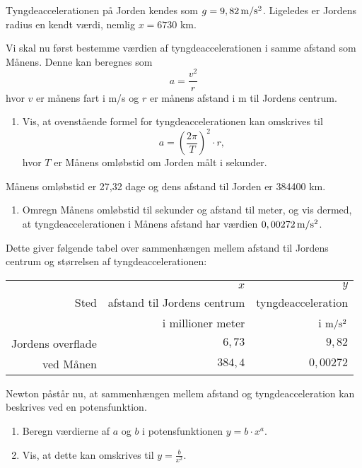 \documentclass[12pt,oneside,a4paper]{article}
\newcommand{\be}{\begin{equation}}
\newcommand{\ee}{\end{equation}}
\theoremstyle{plain}
\begin{document}
Tyngdeaccelerationen på Jorden kendes som $g=9,82\, {\rm m}/{\rm s}^2$.
Ligeledes er Jordens radius en kendt værdi, nemlig $x=6730$ km.

Vi skal nu først bestemme værdien af tyngdeaccelerationen i samme afstand som Månens.
Denne kan beregnes som
\be
a = \frac{v^2}{r}
\label{acc}
\ee
hvor $v$ er månens fart i m/s og $r$ er månens afstand i m til Jordens centrum. 

\begin{enumerate}[label=(\alph*)]
    \item Vis, at ovenstående formel for tyngdeaccelerationen kan omskrives til 
        $$
        a = \left(\frac{2\pi}{T}\right)^2 \cdot r,
        $$
        hvor $T$ er Månens omløbstid om Jorden målt i sekunder. \label{a}
\end{enumerate}

Månens omløbstid er 27,32 dage og dens afstand til Jorden er 384400 km.

\begin{enumerate}[label=(\alph*) ,resume]
    \item Omregn Månens omløbstid til sekunder og afstand til meter, og vis dermed, at tyngdeaccelerationen
        i Månens afstand har værdien $0,00272\, {\rm m}/{\rm s}^2$.
\end{enumerate}

Dette giver følgende tabel over sammenhængen mellem afstand til Jordens centrum og størrelsen af tyngdeaccelerationen:

\begin{center}
\begin{tabular}{r|r|r}
    \hline
          & $x$                         & $y$ \\
    Sted  & afstand til Jordens centrum & tyngdeacceleration   \\
          & i millioner meter           & i ${\rm m}/{\rm s}^2$  \\
    \hline 
    Jordens overflade & $6,73$  & $9,82$ \\
    ved Månen         & $384,4$ & $0,00272$ \\
    \hline 
\end{tabular}
\end{center}

Newton påstår nu, at sammenhængen mellem afstand og tyngdeacceleration kan beskrives ved en potensfunktion.

\begin{enumerate}[label=(\alph*) ,resume]
    \item Beregn værdierne af $a$ og $b$ i potensfunktionen $y=b\cdot x^a$.
    \item Vis, at dette kan omskrives til $y=\frac{b}{x^2}$. \label{n}
\end{enumerate}
\end{document}
